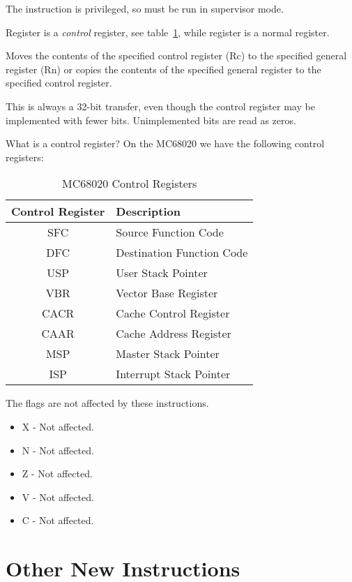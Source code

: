 
The instruction is privileged, so must be run in supervisor mode.

Register  is a \emph{control} register, see table~\ref{tab-MCCR}, while register  is a normal register.

Moves the contents of the specified control register (Rc) to the specified general register (Rn) or copies the contents of the specified general register to the specified control register. 

This is always a 32-bit transfer, even though the control register may be implemented with fewer bits. Unimplemented bits are read as zeros.

What is a control register? On the MC68020 we have the following control registers:

\begin{table}[h]
	\centering
	\begin{tabular}{c|l}
		\textbf{Control Register} & \textbf{Description}\\
		\toprule
		SFC  & Source Function Code\\
		DFC  & Destination Function Code\\
		USP  & User Stack Pointer\\
		VBR  & Vector Base Register\\
		CACR & Cache Control Register\\
		CAAR & Cache Address Register\\
		MSP  & Master Stack Pointer\\
		ISP  & Interrupt Stack Pointer\\
	\end{tabular}
	\caption{MC68020 Control Registers}
	\label{tab-MCCR}
\end{table}

The flags are not affected by these instructions.

\begin{itemize}
    \item X - Not affected.
    \item N - Not affected.
    \item Z - Not affected.
    \item V - Not affected.
    \item C - Not affected.
\end{itemize}

\section{Other New Instructions}

